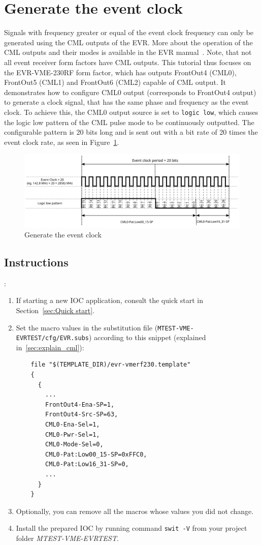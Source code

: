 \documentclass[12pt,a4paper]{article}
\begin{document}
\section{Generate the event clock}\label{sec:generate_event_clock}
Signals with frequency greater or equal of the event clock frequency can only be generated using the CML outputs of the EVR. More about the operation of the CML outputs and their modes is available in the EVR manual~\cite{evr_manual}. Note, that not all event receiver form factors have CML outputs. This tutorial thus focuses on the EVR-VME-230RF form factor, which has outputs FrontOut4 (CML0), FrontOut5 (CML1) and FrontOut6 (CML2) capable of CML output. It demonstrates how to configure CML0 output (corresponds to FrontOut4 output) to generate a clock signal, that has the same phase and frequency as the event clock. To achieve this, the CML0 output source is set to \texttt{logic low}, which causes the logic low pattern of the CML pulse mode to be continuously outputted. The configurable pattern is 20 bits long and is sent out with a bit rate of 20 times the event clock rate, as seen in Figure~\ref{fig:gen_evt_clk}.

\begin{figure}[H]
	\centering
	\includegraphics[width=\columnwidth]{./img/gen_evt_clk}
	\caption{Generate the event clock}
	\label{fig:gen_evt_clk}
\end{figure}

\subsection{Instructions}:
\begin{enumerate}
	\item If starting a new IOC application, consult the quick start in Section~\ref{sec:Quick start}.
	
	\item Set the macro values in the substitution file (\texttt{MTEST-VME-EVRTEST/cfg/EVR.subs}) according to this snippet (explained in~\ref{sec:explain_cml}):
\begin{verbatim}
	file "$(TEMPLATE_DIR)/evr-vmerf230.template"
	{
	  {
	    ...
	    FrontOut4-Ena-SP=1,
	    FrontOut4-Src-SP=63,
	    CML0-Ena-Sel=1,
	    CML0-Pwr-Sel=1,
	    CML0-Mode-Sel=0,
	    CML0-Pat:Low00_15-SP=0xFFC0,
	    CML0-Pat:Low16_31-SP=0, 
	    ...
	  }
	}
\end{verbatim}

	\item Optionally, you can remove all the macros whose values you did not change. 
	\item Install the prepared IOC by running command \texttt{swit -V} from your project folder \textit{MTEST-VME-EVRTEST}.
\end{enumerate}
\end{document}
